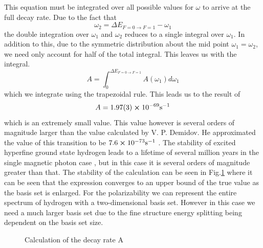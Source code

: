 This equation must be integrated over all possible values for \(\omega\) to arrive at the full decay rate.
Due to the fact that
\begin{equation}
    \omega_2=\Delta E_{F=0 \rightarrow F=1}-\omega_1
\end{equation}
the double integration over $\omega_1$ and $\omega_2$ reduces to a single integral over $\omega_1$. In addition to this, due to the symmetric distribution about the mid point $\omega_1 = \omega_2$, we need only account for half of the total integral. This leaves us with the integral.
\begin{equation}
    A=\int_0^{\Delta E_{F=0 \rightarrow F=1}} A(\omega_1) d\omega_1
\end{equation}
which we integrate using the trapezoidal rule. This leads us to the result of
\begin{equation}
    A=1.97(3)\cross10^{-69}\rm{s}^{-1}
\end{equation}
which is an extremely small value. This value however is several orders of magnitude larger than the value calculated by V. P. Demidov. He approximated the value of this transition to be $7.6\cross10^{-73}\rm{s}^{-1}$ \cite{demidov1962two}. The stability of excited hyperfine ground state hydrogen leads to a lifetime of several million years in the single magnetic photon case \cite{lifetime}, but in this case it is several orders of magnitude greater than that. The stability of the calculation can be seen in Fig.\ref{fig:Calculation of the Decay Rate Variational} where it can be seen that the expression converges to an upper bound of the true value as the basis set is enlarged. For the polarizability we can represent the entire spectrum of hydrogen with a two-dimensional basis set. However in this case we need a much larger basis set due to the fine structure energy splitting being dependent on the basis set size.
\begin{figure}
    \centering
    \caption{Calculation of the decay rate A}
    \label{fig:Calculation of the Decay Rate Variational}
\end{figure}

